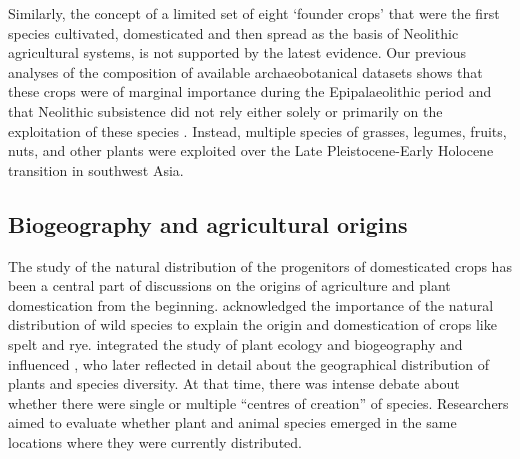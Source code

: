 \documentclass[
  authoryear,
  preprint]{elsarticle}
\begin{document}
Similarly, the concept of a limited set of eight `founder crops'
\citep{ZoharyHopf1988} that were the first species cultivated,
domesticated and then spread as the basis of Neolithic agricultural
systems, is not supported by the latest evidence. Our previous analyses
of the composition of available archaeobotanical datasets shows that
these crops were of marginal importance during the Epipalaeolithic
period \citep{ArranzOtaeguiEtAl2018} and that Neolithic subsistence did
not rely either solely or primarily on the exploitation of these species
\citep{ArranzOtaeguiRoe2023}. Instead, multiple species of grasses,
legumes, fruits, nuts, and other plants were exploited over the Late
Pleistocene-Early Holocene transition in southwest Asia.

\subsection{Biogeography and agricultural
origins}\label{biogeography-and-agricultural-origins}

The study of the natural distribution of the progenitors of domesticated
crops has been a central part of discussions on the origins of
agriculture and plant domestication from the beginning.
\citet{Humboldt1807} acknowledged the importance of the natural
distribution of wild species to explain the origin and domestication of
crops like spelt and rye. \citet{Candolle1886} integrated the study of
plant ecology and biogeography and influenced \citet{Darwin1859}, who
later reflected in detail about the geographical distribution of plants
and species diversity. At that time, there was intense debate about
whether there were single or multiple ``centres of creation'' of
species. Researchers aimed to evaluate whether plant and animal species
emerged in the same locations where they were currently distributed.
\end{document}
